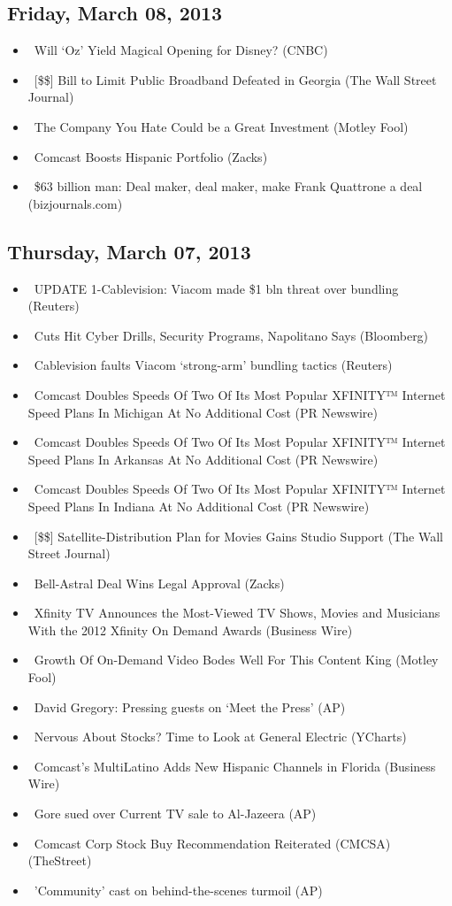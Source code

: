 \documentclass[11pt,asymmetric]{article}
\begin{document}
\subsection*{Friday, March 08, 2013}
\begin{itemize}
\item\ Will `Oz' Yield Magical Opening for Disney? (CNBC)
\item\ [\$\$] Bill to Limit Public Broadband Defeated in Georgia (The Wall Street Journal)
\item\ The Company You Hate Could be a Great Investment (Motley Fool)
\item\ Comcast Boosts Hispanic Portfolio (Zacks)
\item\ \$63 billion man: Deal maker, deal maker, make Frank Quattrone a deal (bizjournals.com)
\end{itemize}
\subsection*{Thursday, March 07, 2013}
\begin{itemize}
\item\ UPDATE 1-Cablevision: Viacom made \$1 bln threat over bundling (Reuters)
\item\ Cuts Hit Cyber Drills, Security Programs, Napolitano Says (Bloomberg)
\item\ Cablevision faults Viacom `strong-arm' bundling tactics (Reuters)
\item\ Comcast Doubles Speeds Of Two Of Its Most Popular XFINITY™ Internet Speed Plans In Michigan At No Additional Cost (PR Newswire)
\item\ Comcast Doubles Speeds Of Two Of Its Most Popular XFINITY™ Internet Speed Plans In Arkansas At No Additional Cost (PR Newswire)
\item\ Comcast Doubles Speeds Of Two Of Its Most Popular XFINITY™ Internet Speed Plans In Indiana At No Additional Cost (PR Newswire)
\item\ [\$\$] Satellite-Distribution Plan for Movies Gains Studio Support (The Wall Street Journal)
\item\ Bell-Astral Deal Wins Legal Approval (Zacks)
\item\ Xfinity TV Announces the Most-Viewed TV Shows, Movies and Musicians With the 2012 Xfinity On Demand Awards (Business Wire)
\item\ Growth Of On-Demand Video Bodes Well For This Content King (Motley Fool)
\item\ David Gregory: Pressing guests on `Meet the Press' (AP)
\item\ Nervous About Stocks? Time to Look at General Electric (YCharts)
\item\ Comcast's MultiLatino Adds New Hispanic Channels in Florida (Business Wire)
\item\ Gore sued over Current TV sale to Al-Jazeera (AP)
\item\ Comcast Corp Stock Buy Recommendation Reiterated (CMCSA) (TheStreet)
\item\ 'Community' cast on behind-the-scenes turmoil (AP)
\end{itemize}
\end{document}
